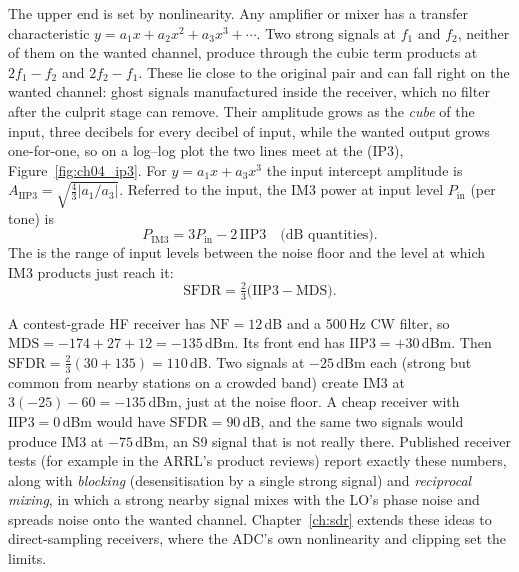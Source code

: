 The upper end is set by nonlinearity. Any amplifier or mixer has a transfer characteristic
$y=a_1x+a_2x^2+a_3x^3+\cdots$. Two strong signals at $f_1$ and $f_2$, neither of them on the wanted channel,
produce through the cubic term  products at $2f_1-f_2$ and $2f_2-f_1$. These
lie close to the original pair and can fall right on the wanted channel: ghost signals manufactured inside
the receiver, which no filter after the culprit stage can remove. Their amplitude grows as the \emph{cube} of
the input, three decibels for every decibel of input, while the wanted output grows one-for-one, so on a
log--log plot the two lines meet at the  (IP3),
Figure~\ref{fig:ch04_ip3}. For $y=a_1x+a_3x^3$ the input intercept amplitude is
$A_{\text{IIP3}}=\sqrt{\tfrac43|a_1/a_3|}$. Referred to the input, the IM3 power at input level
$P_{\text{in}}$ (per tone) is
\begin{equation}
P_{\text{IM3}}=3P_{\text{in}}-2\,\text{IIP3}\quad\text{(dB quantities)}.
\label{eq:ch04:im3}
\end{equation}
The  is the range of input levels between the noise floor and the level at
which IM3 products just reach it:
\begin{equation}
\text{SFDR}=\tfrac23\big(\text{IIP3}-\text{MDS}\big).
\label{eq:ch04:sfdr}
\end{equation}


\begin{worked}
A contest-grade HF receiver has $\text{NF}=12$\,dB and a 500\,Hz CW filter, so $\text{MDS}=-174+27+12=-135$\,dBm.
Its front end has $\text{IIP3}=+30$\,dBm. Then $\text{SFDR}=\frac23(30+135)=110$\,dB. Two signals at $-25$\,dBm
each (strong but common from nearby stations on a crowded band) create IM3 at $3(-25)-60=-135$\,dBm, just at
the noise floor. A cheap receiver with $\text{IIP3}=0$\,dBm would have $\text{SFDR}=90$\,dB, and the same two
signals would produce IM3 at $-75$\,dBm, an S9 signal that is not really there. Published receiver tests (for
example in the ARRL's product reviews) report exactly these numbers, along with \emph{blocking}
(desensitisation by a single strong signal) and \emph{reciprocal mixing}, in which a strong nearby signal
mixes with the LO's phase noise and spreads noise onto the wanted channel. Chapter~\ref{ch:sdr} extends these
ideas to direct-sampling receivers, where the ADC's own nonlinearity and clipping set the limits.
\end{worked}

